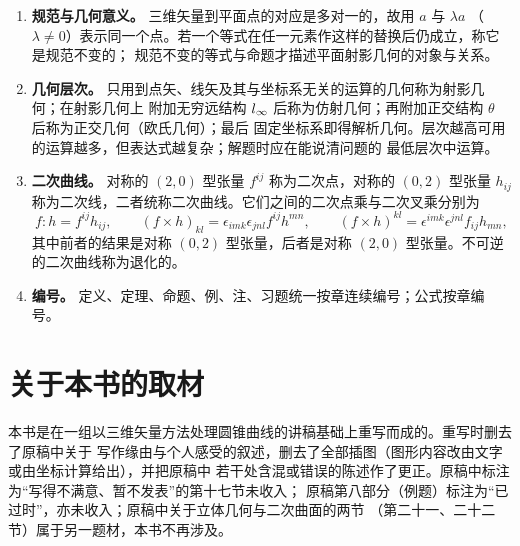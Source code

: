 \begin{enumerate}[label=\textbf{(\arabic*)},leftmargin=2.2em]
\item \textbf{规范与几何意义。} 三维矢量到平面点的对应是多对一的，故用 $a$ 与 $\lambda a$
（$\lambda\neq0$）表示同一个点。若一个等式在任一元素作这样的替换后仍成立，称它是规范不变的；
规范不变的等式与命题才描述平面射影几何的对象与关系。

\item \textbf{几何层次。} 只用到点矢、线矢及其与坐标系无关的运算的几何称为射影几何；在射影几何上
附加无穷远结构 $l_{\infty}$ 后称为仿射几何；再附加正交结构 $\theta$ 后称为正交几何（欧氏几何）；最后
固定坐标系即得解析几何。层次越高可用的运算越多，但表达式越复杂；解题时应在能说清问题的
最低层次中运算。

\item \textbf{二次曲线。} 对称的 $(2,0)$ 型张量 $f^{ij}$ 称为二次点，对称的 $(0,2)$ 型张量 $h_{ij}$
称为二次线，二者统称二次曲线。它们之间的二次点乘与二次叉乘分别为
\[
f:h=f^{ij}h_{ij},\qquad
(f\times h)_{kl}=\epsilon_{imk}\epsilon_{jnl}f^{ij}h^{mn},\qquad
(f\times h)^{kl}=\epsilon^{imk}\epsilon^{jnl}f_{ij}h_{mn},
\]
其中前者的结果是对称 $(0,2)$ 型张量，后者是对称 $(2,0)$ 型张量。不可逆的二次曲线称为退化的。

\item \textbf{编号。} 定义、定理、命题、例、注、习题统一按章连续编号；公式按章编号。

\end{enumerate}

\section*{关于本书的取材}

本书是在一组以三维矢量方法处理圆锥曲线的讲稿基础上重写而成的。重写时删去了原稿中关于
写作缘由与个人感受的叙述，删去了全部插图（图形内容改由文字或由坐标计算给出），并把原稿中
若干处含混或错误的陈述作了更正。原稿中标注为“写得不满意、暂不发表”的第十七节未收入；
原稿第八部分（例题）标注为“已过时”，亦未收入；原稿中关于立体几何与二次曲面的两节
（第二十一、二十二节）属于另一题材，本书不再涉及。

